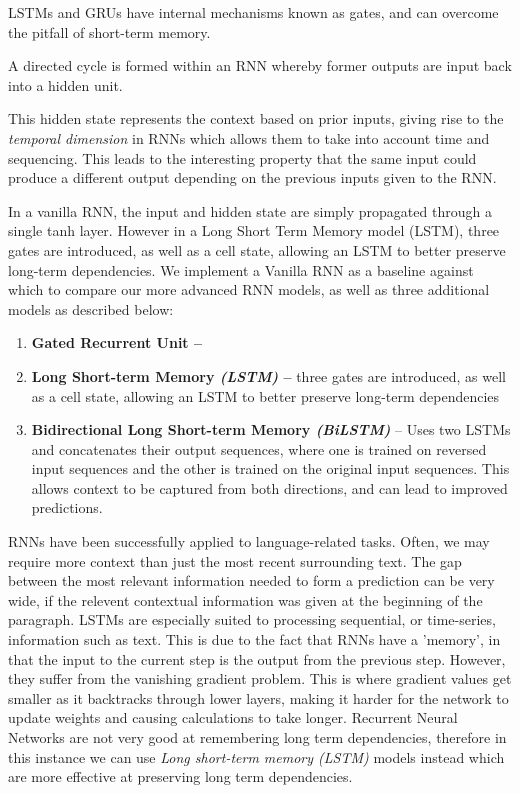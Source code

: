 \documentclass[12pt,a4paper]{article}
\begin{document}
LSTMs and GRUs have internal mechanisms known as gates, and can overcome the pitfall of short-term memory.

A directed cycle is formed within an RNN whereby former outputs are input back into a hidden unit. 

This hidden state represents the context based on prior inputs, giving rise to the \textit{temporal dimension} in RNNs which allows them to take into account time and sequencing. This leads to the interesting property that the same input could produce a different output depending on the previous inputs given to the RNN.

In a vanilla RNN, the input and hidden state are simply propagated through a single tanh layer. However in a Long Short Term Memory model (LSTM), three gates are introduced, as well as a cell state, allowing an LSTM to better preserve long-term dependencies. We implement a Vanilla RNN as a baseline against which to compare our more advanced RNN models, as well as three additional models as described below:

\begin{enumerate}
	\item \textbf{Gated Recurrent Unit -- }
	\item \textbf{Long Short-term Memory \textit{(LSTM)} -- } three gates are introduced, as well as a cell state, allowing an LSTM to better preserve long-term dependencies
	\item \textbf{Bidirectional Long Short-term Memory \textit{(BiLSTM)}} -- Uses two LSTMs and concatenates their output sequences, where one is trained on reversed input sequences and the other is trained on the original input sequences. This allows context to be captured from both directions, and can lead to improved predictions.
\end{enumerate}

RNNs have been successfully applied to language-related tasks. Often, we may require more context than just the most recent surrounding text. The gap between the most relevant information needed to form a prediction can be very wide, if the relevent contextual information was given at the beginning of the paragraph. LSTMs are especially suited to processing sequential, or time-series, information such as text. This is due to the fact that RNNs have a 'memory', in that the input to the current step is the output from the previous step. However, they suffer from the vanishing gradient problem. This is where gradient values get smaller as it backtracks through lower layers, making it harder for the network to update weights and causing calculations to take longer. Recurrent Neural Networks are not very good at remembering long term dependencies, therefore in this instance we can use \textit{Long short-term memory (LSTM)} models \cite{hochreiter1997long} instead which are more effective at preserving long term dependencies.
\end{document}
